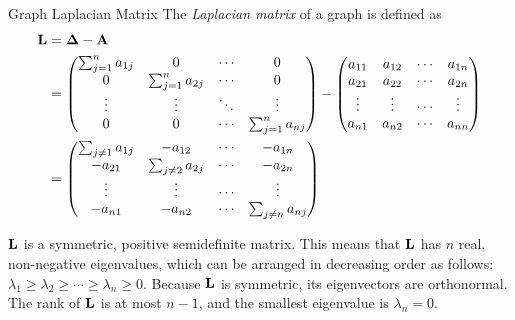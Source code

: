\begin{frame}{Graph Laplacian Matrix}
The {\em
Laplacian matrix} of a graph is def\/{i}ned as
\begin{align*}
    \bL & = \bDelta - \bA \nonumber\\ %
    & =     \matr{
      \sum_{j=1}^n a_{1j} & 0 & \cdots & 0 \\
      0 & \sum_{j=1}^n a_{2j} & \cdots & 0\\
      \vdots & \vdots & \ddots & \vdots\\
      0 & 0 &\cdots  & \sum_{j=1}^n a_{nj} \\
    }
    -
    \matr{
        a_{11} & a_{12} & \cdots & a_{1n}\\
        a_{21} & a_{22} & \cdots & a_{2n}\\
        \vdots & \vdots & \cdots & \vdots\\
        a_{n1} & a_{n2} & \cdots & a_{nn}\\
    } \notag\\
     & =    \matr{
    \sum_{j\ne1} a_{1j} & -a_{12} & \cdots & -a_{1n} \\
    -a_{21} & \sum_{j\ne2} a_{2j} & \cdots & -a_{2n}\\
      \vdots & \vdots & \cdots & \vdots\\
      -a_{n1} & -a_{n2} &\cdots  & \sum_{j\ne n} a_{nj} \\
    } 
\end{align*}

$\mathbf{L}$ is a symmetric, positive
semidef\/{i}nite matrix.
This means that $\mathbf{L}$ has $n$ real, non-negative eigenvalues,
which can be arranged in decreasing order as follows: $\lambda_1
\ge \lambda_2 \ge \cdots \ge \lambda_n \ge 0$.  Because $\mathbf{L}$ is
symmetric, its eigenvectors are orthonormal. 
The rank of $\mathbf{L}$ is at most $n-1$, and the
smallest eigenvalue is $\lambda_n = 0$.
\end{frame}



